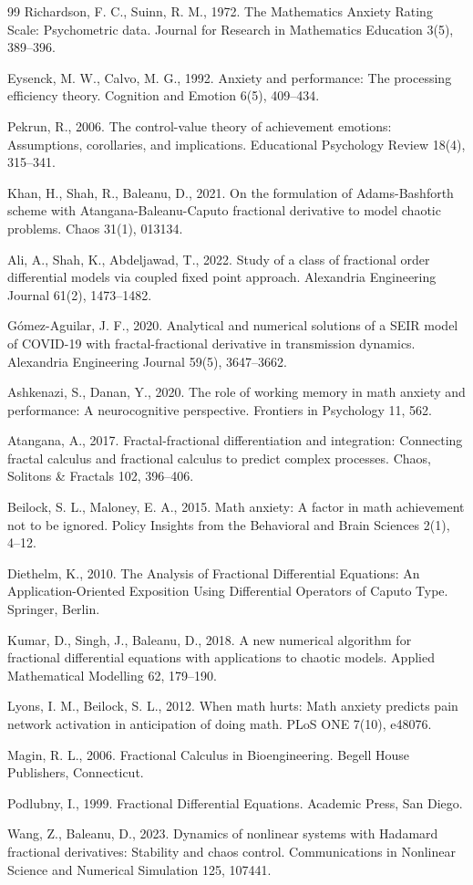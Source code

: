 \documentclass[10pt]{NSP1}
\begin{document}
\begin{thebibliography}{99}
Richardson, F. C., Suinn, R. M., 1972. The Mathematics Anxiety Rating Scale: Psychometric data. Journal for Research in Mathematics Education 3(5), 389–396.

Eysenck, M. W., Calvo, M. G., 1992. Anxiety and performance: The processing efficiency theory. Cognition and Emotion 6(5), 409–434.

Pekrun, R., 2006. The control-value theory of achievement emotions: Assumptions, corollaries, and implications. Educational Psychology Review 18(4), 315–341.

Khan, H., Shah, R., Baleanu, D., 2021. On the formulation of Adams-Bashforth scheme with Atangana-Baleanu-Caputo fractional derivative to model chaotic problems. Chaos 31(1), 013134.

Ali, A., Shah, K., Abdeljawad, T., 2022. Study of a class of fractional order differential models via coupled fixed point approach. Alexandria Engineering Journal 61(2), 1473–1482.

Gómez-Aguilar, J. F., 2020. Analytical and numerical solutions of a SEIR model of COVID-19 with fractal-fractional derivative in transmission dynamics. Alexandria Engineering Journal 59(5), 3647–3662.

Ashkenazi, S., Danan, Y., 2020. The role of working memory in math anxiety and performance: A neurocognitive perspective. Frontiers in Psychology 11, 562.

Atangana, A., 2017. Fractal-fractional differentiation and integration: Connecting fractal calculus and fractional calculus to predict complex processes. Chaos, Solitons \& Fractals 102, 396–406.

Beilock, S. L., Maloney, E. A., 2015. Math anxiety: A factor in math achievement not to be ignored. Policy Insights from the Behavioral and Brain Sciences 2(1), 4–12.

Diethelm, K., 2010. The Analysis of Fractional Differential Equations: An Application-Oriented Exposition Using Differential Operators of Caputo Type. Springer, Berlin.

Kumar, D., Singh, J., Baleanu, D., 2018. A new numerical algorithm for fractional differential equations with applications to chaotic models. Applied Mathematical Modelling 62, 179–190.

Lyons, I. M., Beilock, S. L., 2012. When math hurts: Math anxiety predicts pain network activation in anticipation of doing math. PLoS ONE 7(10), e48076.

Magin, R. L., 2006. Fractional Calculus in Bioengineering. Begell House Publishers, Connecticut.

Podlubny, I., 1999. Fractional Differential Equations. Academic Press, San Diego.

Wang, Z., Baleanu, D., 2023. Dynamics of nonlinear systems with Hadamard fractional derivatives: Stability and chaos control. Communications in Nonlinear Science and Numerical Simulation 125, 107441.

\end{thebibliography}
\end{document}
